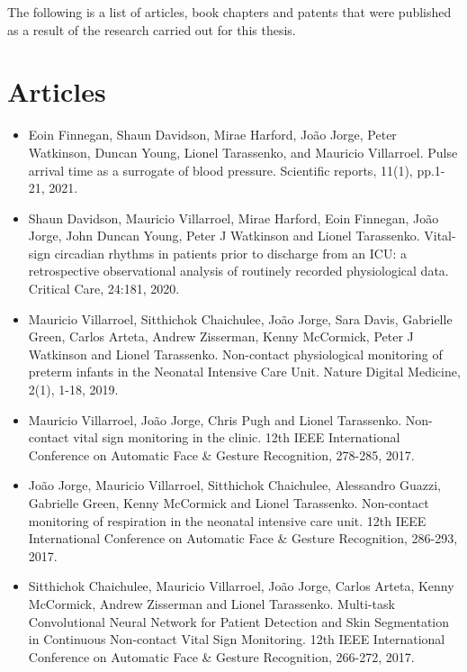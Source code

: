 The following is a list of articles, book chapters and patents that were published as a result of the research carried out for this thesis.
 
\section*{Articles}

\begin{itemize}

    \item Eoin Finnegan, Shaun Davidson, Mirae Harford, Jo\~{a}o Jorge, Peter Watkinson, Duncan Young, Lionel Tarassenko, and Mauricio Villarroel. Pulse arrival time as a surrogate of blood pressure. Scientific reports, 11(1), pp.1-21, 2021.

    \item Shaun Davidson, Mauricio Villarroel, Mirae Harford, Eoin Finnegan, Jo\~{a}o Jorge, John Duncan Young, Peter J Watkinson and Lionel Tarassenko. Vital-sign circadian rhythms in patients prior to discharge from an ICU: a retrospective observational analysis of routinely recorded physiological data. Critical Care, 24:181, 2020.

    \item Mauricio Villarroel, Sitthichok Chaichulee, Jo\~{a}o Jorge, Sara Davis, Gabrielle Green, Carlos Arteta, Andrew Zisserman, Kenny McCormick, Peter J Watkinson and Lionel Tarassenko. Non-contact physiological monitoring of preterm infants in the Neonatal Intensive Care Unit. Nature Digital Medicine, 2(1), 1-18, 2019.

    \item Mauricio Villarroel,  Jo\~{a}o Jorge, Chris Pugh and Lionel Tarassenko. Non-contact vital sign monitoring in the clinic. 12th IEEE International Conference on Automatic Face \& Gesture Recognition, 278-285, 2017.
     
    \item Jo\~{a}o Jorge, Mauricio Villarroel,  Sitthichok Chaichulee, Alessandro Guazzi,  Gabrielle Green, Kenny McCormick and Lionel Tarassenko. Non-contact monitoring of respiration in the neonatal intensive care unit. 12th IEEE International Conference on Automatic Face \& Gesture Recognition, 286-293, 2017.

    \item Sitthichok Chaichulee, Mauricio Villarroel,  Jo\~{a}o Jorge, Carlos Arteta,  Kenny McCormick, Andrew Zisserman and Lionel Tarassenko. Multi-task Convolutional Neural Network for Patient Detection and Skin Segmentation in Continuous Non-contact Vital Sign Monitoring. 12th IEEE International Conference on Automatic Face \& Gesture Recognition, 266-272, 2017.


\end{itemize}

